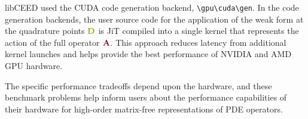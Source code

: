 libCEED used the CUDA code generation backend, \lstinline{\gpu\cuda\gen}.
In the code generation backends, the user source code for the application of the weak form at the quadrature points ${\color{applegreen}\mathbf{D}}$ is JiT compiled into a single kernel that represents the action of the full operator ${\color{burgundy}\mathbf{A}}$.
This approach reduces latency from additional kernel launches and helps provide the best performance of NVIDIA and AMD GPU hardware.

The specific performance tradeoffs depend upon the hardware, and these benchmark problems help inform users about the performance capabilities of their hardware for high-order matrix-free representations of PDE operators.
